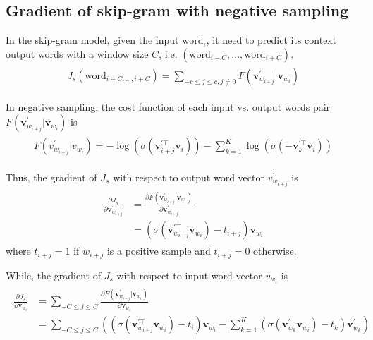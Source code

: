 \documentclass[paper=a4, fontsize=11pt]{scrartcl} %
\numberwithin{equation}{section} %
\numberwithin{figure}{section} %
\numberwithin{table}{section} %
\begin{document}
\subsection{Gradient of skip-gram with negative sampling}
In the skip-gram model, given the input $\mbox{word}_{i}$, it need to predict its context output words with a window size $C$, i.e. $(\mbox{word}_{i-C},...,\mbox{word}_{i+C})$.  
\begin{align} 
\begin{split}
	J_{s}(\mbox{word}_{i-C,...,i+C}) = \sum_{-c \leq j \leq c,j \neq 0} F(\boldsymbol{v}^{\prime}_{w_{i+j}} | \boldsymbol{v}_{w_{i}})
\end{split}					
\end{align}

In negative sampling, the cost function of each input vs. output words pair $F(\boldsymbol{v}^{\prime}_{w_{i+j}} | \boldsymbol{v}_{w_{i}})$ is 
\begin{align} 
\begin{split}
	F(v^{\prime}_{w_{i+j}}|v_{w_{i}}) = -\log(\sigma(\boldsymbol{v}^{\prime \top}_{i+j} \boldsymbol{v}_{i})) - \sum_{k=1}^{K} \log(\sigma(- \boldsymbol{v}_{k}^{\prime \top} \boldsymbol{v}_{i}))   
\end{split}					
\end{align}

Thus, the gradient of $J_{s}$ with respect to output word vector $v^{\prime}_{w_{i+j}}$ is
\begin{align} 
\begin{split}
	\frac{\partial J_{s}}{\partial \boldsymbol{v}^{\prime}_{w_{i+j}}} &= \frac{\partial F(\boldsymbol{v}^{\prime}_{w_{i+j}} | \boldsymbol{v}_{w_{i}})}{\partial \boldsymbol{v}^{\prime}_{w_{i+j}}} \\
	& = (\sigma(\boldsymbol{v}_{w_{i+j}}^{\prime \top}\boldsymbol{v}_{w_{i}}) - t_{i+j}) \boldsymbol{v}_{w_{i}}
\end{split}					
\end{align}
where $t_{i+j}=1$ if $w_{i+j}$ is a positive sample and $t_{i+j}=0$ otherwise.

While, the gradient of $J_{s}$ with respect to input word vector $v_{w_{i}}$ is
\begin{align} 
\begin{split}
	\frac{\partial J_{s}}{\partial \boldsymbol{v}_{w_{i}}} &= \sum_{-C \leq j \leq C} \frac{\partial F(\boldsymbol{v}^{\prime}_{w_{i+j}} | \boldsymbol{v}_{w_{i}})}{\partial \boldsymbol{v}_{w_{i}}} \\
	&= \sum_{-C \leq j \leq C} \left( \left(\sigma(\boldsymbol{v}_{w_{i+j}}^{\prime \top}\boldsymbol{v}_{w_{i}}) - t_{i} \right) \boldsymbol{v}_{w_{i}} - \sum_{k=1}^{K} \left(\sigma(\boldsymbol{v}_{w_{k}}^{\prime} \boldsymbol{v}_{w_{i}}) - t_{k} \right) \boldsymbol{v}^{\prime}_{w_{k}} \right)	
\end{split}					
\end{align}
\end{document}
